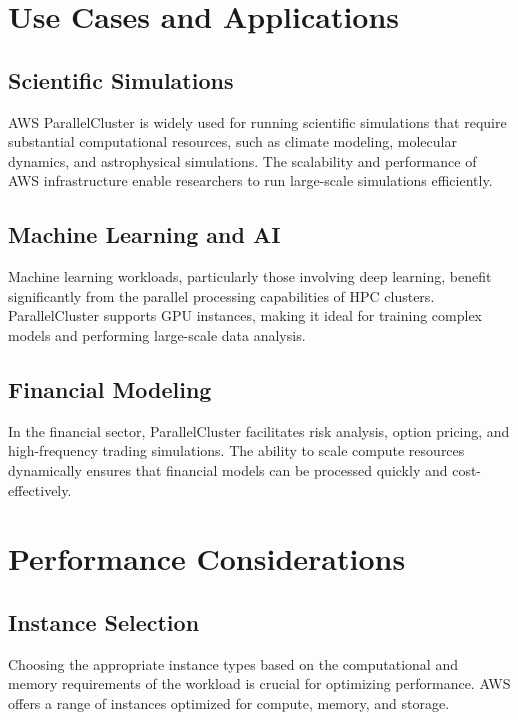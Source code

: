 \section{Use Cases and Applications}

\subsection{Scientific Simulations}

AWS ParallelCluster is widely used for running scientific simulations that require substantial computational resources, such as climate modeling, molecular dynamics, and astrophysical simulations. The scalability and performance of AWS infrastructure enable researchers to run large-scale simulations efficiently.

\subsection{Machine Learning and AI}

Machine learning workloads, particularly those involving deep learning, benefit significantly from the parallel processing capabilities of HPC clusters. ParallelCluster supports GPU instances, making it ideal for training complex models and performing large-scale data analysis.

\subsection{Financial Modeling}

In the financial sector, ParallelCluster facilitates risk analysis, option pricing, and high-frequency trading simulations. The ability to scale compute resources dynamically ensures that financial models can be processed quickly and cost-effectively.

\section{Performance Considerations}

\subsection{Instance Selection}

Choosing the appropriate instance types based on the computational and memory requirements of the workload is crucial for optimizing performance. AWS offers a range of instances optimized for compute, memory, and storage.

